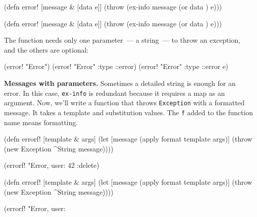
\ifx\DEVICETYPE\MOBILE

\begin{english}
  \begin{clojure}
(defn error! [message & [data e]]
  (throw (ex-info message
           (or data {}) e)))
  \end{clojure}
\end{english}

\else

\begin{english}
  \begin{clojure}
(defn error! [message & [data e]]
  (throw (ex-info message (or data {}) e)))
  \end{clojure}
\end{english}

\fi

\noindent
The function needs only one parameter~--- a string~--- to throw an exception, and the others are optional:

\begin{english}
  \begin{clojure}
(error! "Error")
(error! "Error" {:type ::error})
(error! "Error" {:type ::error} e)
  \end{clojure}
\end{english}

\textbf{ Messages with parameters.} Sometimes a detailed string is enough for an error. In this case, \verb|ex-info| is redundant because it requires a map as an argument. Now, we'll write a function that throws \verb|Exception| with a formatted message. It takes a template and substitution values.
The \verb|f| added to the function name means formatting.


\ifx\DEVICETYPE\MOBILE

\begin{english}
  \begin{clojure}
(defn errorf! [template & args]
  (let [message (apply format
                  template args)]
    (throw (new Exception
             ^String message))))

(errorf! "Error, user: %
  42 :delete)
  \end{clojure}
\end{english}

\else

\begin{english}
  \begin{clojure}
(defn errorf! [template & args]
  (let [message (apply format template args)]
    (throw (new Exception ^String message))))

(errorf! "Error, user: %
  \end{clojure}
\end{english}

